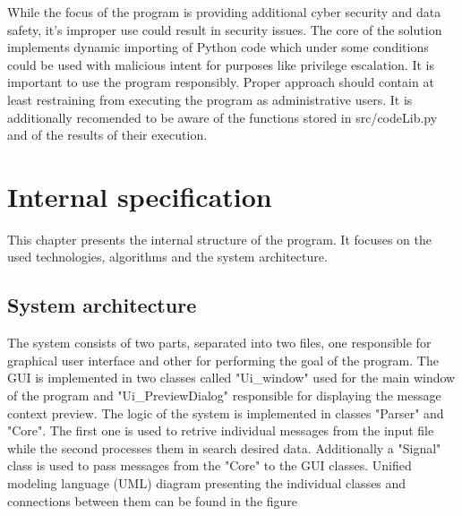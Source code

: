 \documentclass[a4paper,twoside,12pt]{book}
\begin{document}
While the focus of the program is providing additional cyber security and data safety, it's 
improper use could result in security issues. The core of the solution implements
dynamic importing of Python code which under some conditions could be used with malicious
intent for purposes like privilege escalation. It is important to use the program 
responsibly. Proper approach should contain at least restraining from executing
the program as administrative users. It is additionally recomended to be aware of the 
functions stored in src/codeLib.py and of the results of their execution. 

\chapter{Internal specification}

This chapter presents the internal structure of the program. It focuses on the used technologies, algorithms and the system architecture.


\section{System architecture}

The system consists of two parts, separated into two files, one responsible for graphical user interface and other for
performing the goal of the program. The GUI is implemented in two classes called "Ui\_window" used for the main window of the program and "Ui\_PreviewDialog" responsible for displaying 
the message context preview. The logic of the system is implemented in classes "Parser" and "Core". The first one is used to retrive individual messages from the input file while the second
processes them in search desired data. Additionally a "Signal" class is used to pass messages from the "Core" to the GUI classes. Unified modeling language (UML) diagram presenting the individual classes and connections between them can be found in the figure %
\end{document}
